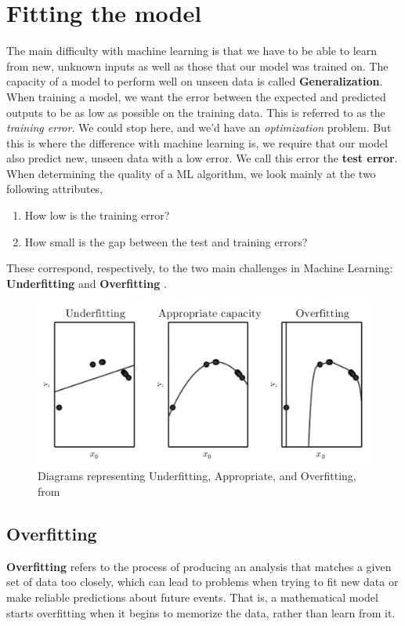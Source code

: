 \documentclass[nobib]{tufte-handout} %
\begin{document}
 \section{Fitting the model}
 The main difficulty with machine learning is that we have to be able to learn from new, unknown inputs as well as those that our model was trained on. The capacity of a model to perform well on unseen data is called \textbf{Generalization}. When training a model, we want the error between the expected and predicted outputs to be as low as possible on the training data. This is referred to as the \textit{training error}. We could stop here, and we'd have an \textit{optimization} problem. But this is where the difference with machine learning is, we require that our model also predict new, unseen data with a low error. We call this error the \textbf{test error}. 
When determining the quality of a ML algorithm, we look mainly at the two following attributes,
\begin{enumerate}
  \item How low is the training error? 
  \item How small is the gap between the test and training errors?
\end{enumerate}
These correspond, respectively, to the two main challenges in Machine Learning: \textbf{Underfitting} and \textbf{Overfitting} \citep{Goodfellow-et-al-2016}.
\begin{figure}
\includegraphics{fitting}
  \caption{Diagrams representing Underfitting, Appropriate, and Overfitting, from \citep{Goodfellow-et-al-2016}}
\end{figure}
  \subsection{Overfitting}%
  \label{sub:Overfitting}
\textbf{Overfitting} refers to the process of producing an analysis that matches a given set of data too closely, which can lead to problems when trying to fit new data or make reliable predictions about future events. That is, a mathematical model starts overfitting when it begins to memorize the data, rather than learn from it. 
\end{document}
